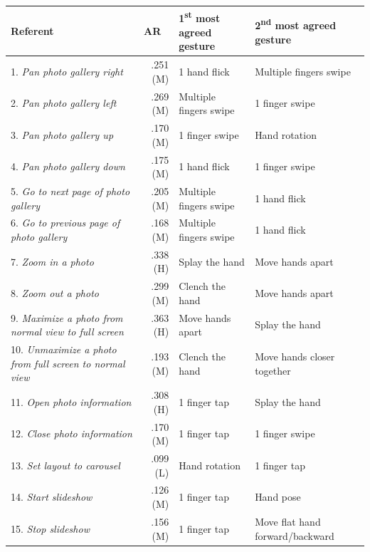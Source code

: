 \begin{table}[ht]
	\renewcommand{\arraystretch}{1.1}
	\captionsetup{justification=centering}
	\footnotesize
	\begin{tabular}{p{3.35cm}rp{2.875cm}p{2.975cm}}
		\toprule
		\textbf{Referent} & \multicolumn{1}{l}{\textbf{AR}} & \textbf{1\textsuperscript{st} most agreed gesture} & \textbf{2\textsuperscript{nd} most agreed gesture} \\
		\midrule
		1. \textit{Pan photo gallery right} & \cellcolor{graybluebrighter} .251 (M) & 1 hand flick & Multiple fingers swipe\\
        2. \textit{Pan photo gallery left} & \cellcolor{graybluebrighter} .269 (M) & Multiple fingers swipe & 1 finger swipe\\
        3. \textit{Pan photo gallery up} & .170 (M) & 1 finger swipe & Hand rotation\\
        4. \textit{Pan photo gallery down} & .175 (M) & 1 hand flick & 1 finger swipe\\
        5. \textit{Go to next page of photo gallery} & .205 (M) & Multiple fingers swipe & 1 hand flick\\
        6. \textit{Go to previous page of photo gallery} & .168 (M) & Multiple fingers swipe & 1 hand flick\\
        7. \textit{Zoom in a photo} & \cellcolor{graybluebrighter} .338 (H) & Splay the hand & Move hands apart\\
        8. \textit{Zoom out a photo} & \cellcolor{graybluebrighter} .299 (M) & Clench the hand & Move hands apart\\
        9. \textit{Maximize a photo from normal view to full screen} & \cellcolor{graybluebrighter} .363 (H) & Move hands apart & Splay the hand\\
        10. \textit{Unmaximize a photo from full screen to normal view} & .193 (M) & Clench the hand & Move hands closer together\\
        11. \textit{Open photo information} & \cellcolor{graybluebrighter} .308 (H) & 1 finger tap & Splay the hand\\
        12. \textit{Close photo information} & .170 (M) & 1 finger tap & 1 finger swipe\\
        13. \textit{Set layout to carousel} & .099 (L) & Hand rotation & 1 finger tap\\
        14. \textit{Start slideshow} & .126 (M) & 1 finger tap & Hand pose\\
        15. \textit{Stop slideshow} & .156 (M) & 1 finger tap & Move flat hand forward/backward\\

\end{tabular}
\end{table}
